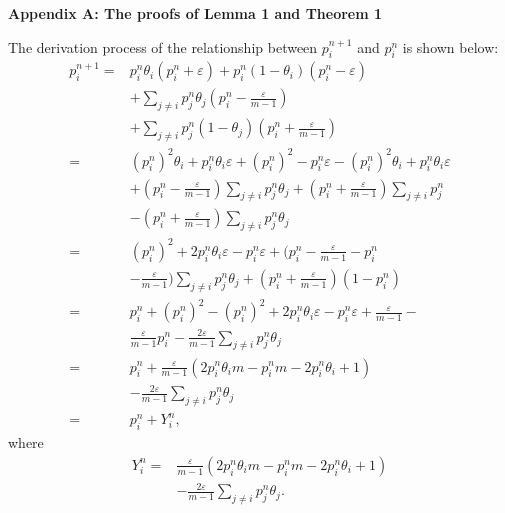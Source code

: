 \documentclass[10pt,journal,cspaper,compsoc,onecolumn]{IEEEtran}
\begin{document}
\large{\textbf{Appendix A: The proofs of Lemma 1 and Theorem 1}}

The derivation process of the relationship between $p_i^{n + 1}$ and $p_i^{n}$ is shown below:
\begin{equation}
    \label{eq:7}
    \begin{split}
    p_i^{n + 1} = &p_i^n\theta_i(p_i^n + \varepsilon) + p_i^n(1-\theta_i)(p_i^n - \varepsilon)\\
    &+ \sum_{j \neq i}p_j^n\theta_j(p_i^n - \displaystyle \frac{\varepsilon}{m- 1})\\
    &+ \sum_{j \neq i}p_j^n(1 - \theta_j)(p_i^n + \displaystyle\frac{\varepsilon}{m - 1})\\
    =&(p_i^n)^2\theta_i + p_i^n\theta_i\varepsilon + (p_i^n)^2 - p_i^n\varepsilon - (p_i^n)^2\theta_i + p_i^n\theta_i\varepsilon\\
    & + (p_i^n - \displaystyle\frac{\varepsilon}{m - 1})\sum_{j \neq i}p_j^n\theta_j + (p_i^n + \displaystyle\frac{\varepsilon}{m - 1})\sum_{j \neq i}p_j^n\\
    &- (p_i^n + \displaystyle\frac{\varepsilon}{m - 1})\sum_{j \neq i}p_j^n\theta_j\\
    =&(p_i^n)^2 + 2p_i^n\theta_i\varepsilon - p_i^n\varepsilon + (p_i^n - \displaystyle\frac{\varepsilon}{m - 1} - p_i^n \\
    &- \displaystyle\frac{\varepsilon}{m - 1})\sum_{j \neq i}p_j^n\theta_j + (p_i^n + \displaystyle\frac{\varepsilon}{m - 1})(1 - p_i^n)\\
    =&p_i^n + (p_i^n)^2 - (p_i^n)^2 + 2p_i^n\theta_i\varepsilon - p_i^n\varepsilon + \displaystyle\frac{\varepsilon}{m - 1} - \\
    &\displaystyle\frac{\varepsilon}{m - 1}p_i^n - \displaystyle\frac{2\varepsilon}{m - 1}\sum_{j \neq i}p_j^n\theta_j\\
    =&p_i^n + \displaystyle\frac{\varepsilon}{m - 1}(2p_i^n\theta_im - p_i^nm - 2p_i^n\theta_i + 1 )\\
    &- \displaystyle\frac{2\varepsilon}{m-1}\sum_{j \neq i}p_j^n\theta_j\\
    =&p_i^n + Y_i^n,
    \end{split}
\end{equation}
where
\begin{equation}
    \begin{split}
    \label{eq:yi}
    Y_i^n = &\displaystyle\frac{\varepsilon}{m - 1}(2p_i^n\theta_im - p_i^nm - 2p_i^n\theta_i + 1 )\\
             &- \displaystyle\frac{2\varepsilon}{m-1}\sum_{j \neq i}p_j^n\theta_j.
    \end{split}
 \end{equation}
 
\end{document}
